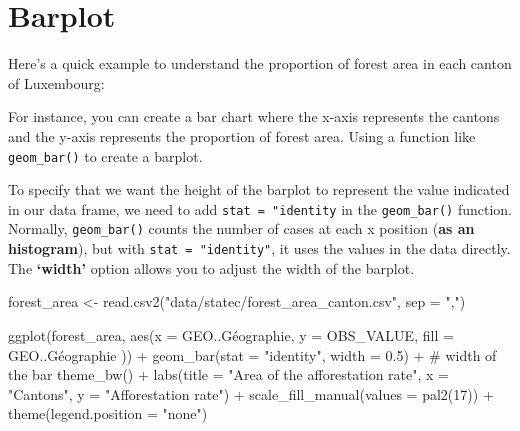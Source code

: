 \documentclass[
  letterpaper,
  DIV=11,
  numbers=noendperiod]{scrreprt}
\newenvironment{Shaded}{\begin{snugshade}}{\end{snugshade}}
\newcommand{\AttributeTok}[1]{\textcolor[rgb]{0.40,0.45,0.13}{#1}}
\newcommand{\CommentTok}[1]{\textcolor[rgb]{0.37,0.37,0.37}{#1}}
\newcommand{\DecValTok}[1]{\textcolor[rgb]{0.68,0.00,0.00}{#1}}
\newcommand{\FloatTok}[1]{\textcolor[rgb]{0.68,0.00,0.00}{#1}}
\newcommand{\FunctionTok}[1]{\textcolor[rgb]{0.28,0.35,0.67}{#1}}
\newcommand{\NormalTok}[1]{\textcolor[rgb]{0.00,0.23,0.31}{#1}}
\newcommand{\OtherTok}[1]{\textcolor[rgb]{0.00,0.23,0.31}{#1}}
\newcommand{\SpecialCharTok}[1]{\textcolor[rgb]{0.37,0.37,0.37}{#1}}
\newcommand{\StringTok}[1]{\textcolor[rgb]{0.13,0.47,0.30}{#1}}
\begin{document}
\section{Barplot}\label{barplot}

Here's a quick example to understand the proportion of forest area in
each canton of Luxembourg:

For instance, you can create a bar chart where the x-axis represents the
cantons and the y-axis represents the proportion of forest area. Using a
function like \texttt{geom\_bar()} to create a barplot.

To specify that we want the height of the barplot to represent the value
indicated in our data frame, we need to add \texttt{stat\ =\ "identity}
in the \texttt{geom\_bar()} function. Normally, \texttt{geom\_bar()}
counts the number of cases at each x position (\textbf{as an
histogram}), but with \texttt{stat\ =\ "identity"}, it uses the values
in the data directly. The \textbf{`width'} option allows you to adjust
the width of the barplot.

\begin{Shaded}
\begin{Highlighting}[]
\NormalTok{forest\_area }\OtherTok{\textless{}{-}} \FunctionTok{read.csv2}\NormalTok{(}\StringTok{"data/statec/forest\_area\_canton.csv"}\NormalTok{, }\AttributeTok{sep =} \StringTok{","}\NormalTok{) }

\FunctionTok{ggplot}\NormalTok{(forest\_area, }\FunctionTok{aes}\NormalTok{(}\AttributeTok{x =}\NormalTok{ GEO..Géographie, }\AttributeTok{y =}\NormalTok{ OBS\_VALUE, }\AttributeTok{fill =}\NormalTok{ GEO..Géographie )) }\SpecialCharTok{+}
  \FunctionTok{geom\_bar}\NormalTok{(}\AttributeTok{stat =} \StringTok{"identity"}\NormalTok{,}
           \AttributeTok{width =} \FloatTok{0.5}\NormalTok{) }\SpecialCharTok{+} \CommentTok{\# width of the bar}
  \FunctionTok{theme\_bw}\NormalTok{() }\SpecialCharTok{+}
  \FunctionTok{labs}\NormalTok{(}\AttributeTok{title =} \StringTok{"Area of the afforestation rate"}\NormalTok{, }\AttributeTok{x =} \StringTok{"Cantons"}\NormalTok{, }\AttributeTok{y =} \StringTok{"Afforestation rate"}\NormalTok{) }\SpecialCharTok{+}
  \FunctionTok{scale\_fill\_manual}\NormalTok{(}\AttributeTok{values =} \FunctionTok{pal2}\NormalTok{(}\DecValTok{17}\NormalTok{)) }\SpecialCharTok{+}
  \FunctionTok{theme}\NormalTok{(}\AttributeTok{legend.position =} \StringTok{"none"}\NormalTok{) }
\end{Highlighting}
\end{Shaded}
\end{document}
